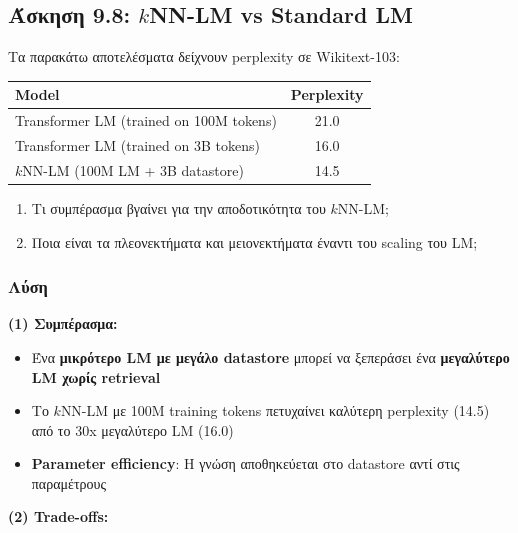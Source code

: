 \subsection{Άσκηση 9.8: $k$NN-LM vs Standard LM}

\begin{formulabox}[Εκφώνηση]
Τα παρακάτω αποτελέσματα δείχνουν perplexity σε Wikitext-103:

\begin{center}
\begin{tabular}{lc}
\toprule
\textbf{Model} & \textbf{Perplexity} \\
\midrule
Transformer LM (trained on 100M tokens) & 21.0 \\
Transformer LM (trained on 3B tokens) & 16.0 \\
$k$NN-LM (100M LM + 3B datastore) & 14.5 \\
\bottomrule
\end{tabular}
\end{center}

\begin{enumerate}
    \item Τι συμπέρασμα βγαίνει για την αποδοτικότητα του $k$NN-LM;
    \item Ποια είναι τα πλεονεκτήματα και μειονεκτήματα έναντι του scaling του LM;
\end{enumerate}
\end{formulabox}

\subsubsection*{Λύση}

\textbf{(1) Συμπέρασμα:}

\begin{itemize}
    \item Ένα \textbf{μικρότερο LM με μεγάλο datastore} μπορεί να ξεπεράσει ένα
    \textbf{μεγαλύτερο LM χωρίς retrieval}

    \item Το $k$NN-LM με 100M training tokens πετυχαίνει καλύτερη perplexity (14.5)
    από το 30x μεγαλύτερο LM (16.0)

    \item \textbf{Parameter efficiency}: Η γνώση αποθηκεύεται στο datastore
    αντί στις παραμέτρους
\end{itemize}

\textbf{(2) Trade-offs:}

